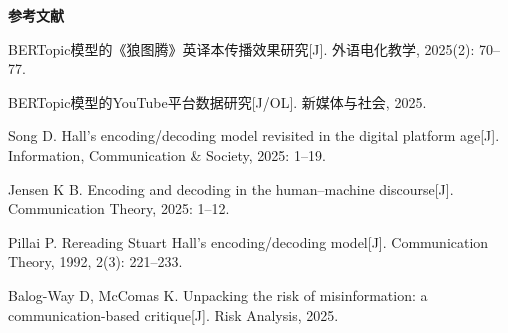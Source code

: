 \documentclass[12pt, a4paper]{article}
\begin{document}
\vspace{12pt}
\begin{center}{\bfseries\cjkfont\fontsize{13pt}{17pt}\selectfont 参考文献}\end{center}
\vspace{4pt}

{%
%



BERTopic{\cjkfont 模型的《狼图腾》英译本传播效果研究[J]. 外语电化教学, 2025(2): 70--77.}

BERTopic{\cjkfont 模型的}YouTube{\cjkfont 平台数据研究[J/OL]. 新媒体与社会, 2025.}







\noindent [13] Song D. Hall's encoding/decoding model revisited in the digital platform age[J]. Information, Communication \& Society, 2025: 1--19.

\noindent [14] Jensen K B. Encoding and decoding in the human--machine discourse[J]. Communication Theory, 2025: 1--12.

\noindent [15] Pillai P. Rereading Stuart Hall's encoding/decoding model[J]. Communication Theory, 1992, 2(3): 221--233.

\noindent [16] Balog-Way D, McComas K. Unpacking the risk of misinformation: a communication-based critique[J]. Risk Analysis, 2025.

}
\end{document}
